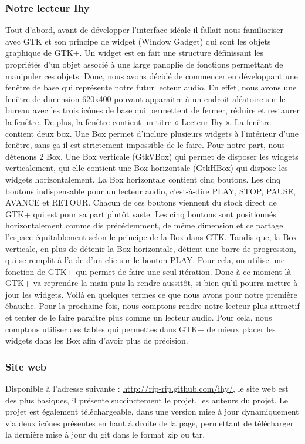\documentclass[a4paper,12pt]{article}
\begin{document}
		\subsubsection{Notre lecteur Ihy}
Tout d'abord, avant de développer l'interface idéale il fallait nous
familiariser avec GTK et son principe de widget (Window Gadget) qui sont les
objets graphique de GTK+. Un widget est en fait une structure définissant les
propriétés d'un objet associé à une large panoplie de fonctions permettant de
manipuler ces objets. Donc, nous avons décidé de commencer en développant une
fenêtre de base qui représente notre futur lecteur audio. En effet, nous avons
une fenêtre de dimension 620x400 pouvant apparaitre à un endroit aléatoire sur
le bureau avec les trois icônes de base qui permettent de fermer, réduire et
restaurer la fenêtre. De plus, la fenêtre contient un titre « Lecteur Ihy ».  La
fenêtre contient deux box. Une Box permet d'inclure plusieurs widgets à
l'intérieur d'une fenêtre, sans ça il est strictement impossible de le faire.
Pour notre part, nous détenons 2 Box. Une Box verticale (GtkVBox) qui permet de
disposer les widgets verticalement, qui elle contient une Box horizontale
(GtkHBox) qui dispose les widgets horizontalement. La Box horizontale contient
cinq boutons. Les cinq boutons indispensable pour un lecteur audio, c'est-à-dire
PLAY, STOP, PAUSE, AVANCE et RETOUR. Chacun de ces boutons viennent du stock
direct de GTK+ qui est pour sa part plutôt vaste. Les cinq boutons sont
positionnés horizontalement comme dis précédemment, de même dimension et ce
partage l'espace équitablement selon le principe de la Box dans GTK.  Tandis
que, la Box verticale, en plus de détenir la Box horizontale, détient une barre
de progression, qui se remplit à l'aide d'un clic sur le bouton PLAY. Pour
cela, on utilise une fonction de GTK+ qui permet de faire une seul itération.
Donc à ce moment là GTK+ va reprendre la main puis la rendre aussitôt, si bien
qu’il pourra mettre à jour les widgets.  Voilà en quelques termes ce que
nous avons pour notre première ébauche. Pour la prochaine fois, nous comptons
rendre notre lecteur plus attractif et tenter de le faire paraitre plus comme un
lecteur audio. Pour cela, nous comptons utiliser des tables qui permettes dans
GTK+ de mieux placer les widgets dans les Box afin d'avoir plus de précision. 

		\subsubsection{Site web}
Disponible à l'adresse suivante : \url{http://rip-rip.github.com/ihy/}, le site
web est des plus basiques, il présente succinctement le projet, les auteurs du
projet. Le projet est également téléchargeable, dans une version mise à jour
dynamiquement via deux icônes présentes en haut à droite de la page, permettant
de télécharger la dernière mise à jour du git dans le format zip ou tar.
\end{document}
